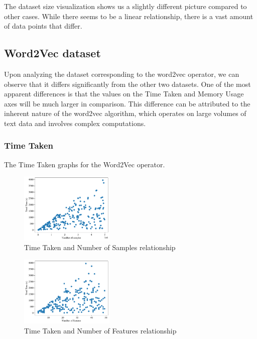 \documentclass[conference]{IEEEtran}
\begin{document}
The dataset size visualization shows us a slightly different picture compared to other cases. While there seems to be a linear relationship, there is a vast amount of data points that differ.

\vfill

\subsection{Word2Vec dataset}

Upon analyzing the dataset corresponding to the word2vec operator, we can observe that it differs significantly from the other two datasets. One of the most apparent differences is that the values on the Time Taken and Memory Usage axes will be much larger in comparison. This difference can be attributed to the inherent nature of the word2vec algorithm, which operates on large volumes of text data and involves complex computations.


\subsubsection{\textbf{Time Taken}}
The Time Taken graphs for the Word2Vec operator.

\begin{figure}[ht]
\centering
\includegraphics[width=0.4\textwidth]{plots/experiment_results/word2vec_time_samples.pdf}
\caption{Time Taken and Number of Samples relationship}
\end{figure}

\begin{figure}[ht]
    \centering
\includegraphics[width=0.4\textwidth]{plots/experiment_results/word2vec_time_features.pdf}
    \caption{Time Taken and Number of Features relationship}
\end{figure}
\end{document}
